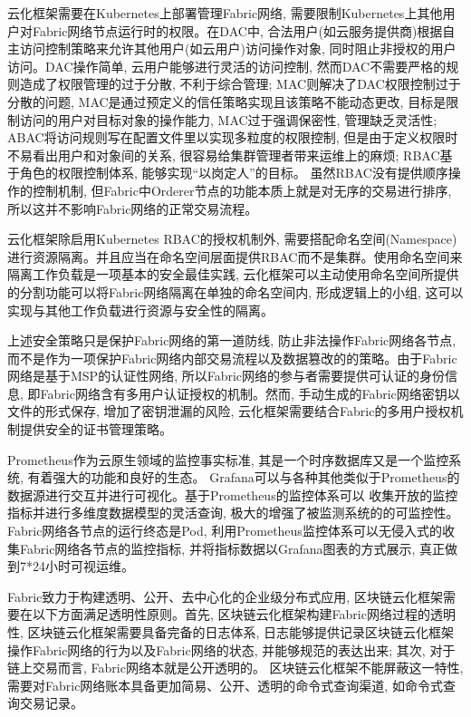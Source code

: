 云化框架需要在Kubernetes上部署管理Fabric网络, 需要限制Kubernetes上其他用户对Fabric网络节点运行时的权限。在DAC中, 合法用户(如云服务提供商)根据自主访问控制策略来允许其他用户(如云用户)访问操作对象\cite{lopez2018access}, 同时阻止非授权的用户访问。DAC操作简单, 云用户能够进行灵活的访问控制, 然而DAC不需要严格的规则造成了权限管理的过于分散, 不利于综合管理; MAC则解决了DAC权限控制过于分散的问题, MAC是通过预定义的信任策略实现且该策略不能动态更改, 目标是限制访问的用户对目标对象的操作能力, MAC过于强调保密性, 管理缺乏灵活性; ABAC将访问规则写在配置文件里以实现多粒度的权限控制, 但是由于定义权限时不易看出用户和对象间的关系, 很容易给集群管理者带来运维上的麻烦; RBAC基于角色的权限控制体系, 能够实现“以岗定人”的目标。 虽然RBAC没有提供顺序操作的控制机制, 但Fabric中Orderer节点的功能本质上就是对无序的交易进行排序,所以这并不影响Fabric网络的正常交易流程。

云化框架除启用Kubernetes RBAC的授权机制外, 需要搭配命名空间(Namespace)进行资源隔离。并且应当在命名空间层面提供RBAC而不是集群。使用命名空间来隔离工作负载是一项基本的安全最佳实践, 云化框架可以主动使用命名空间所提供的分割功能可以将Fabric网络隔离在单独的命名空间内, 形成逻辑上的小组, 这可以实现与其他工作负载进行资源与安全性的隔离。

上述安全策略只是保护Fabric网络的第一道防线, 防止非法操作Fabric网络各节点, 而不是作为一项保护Fabric网络内部交易流程以及数据篡改的的策略。由于Fabric网络是基于MSP的认证性网络, 所以Fabric网络的参与者需要提供可认证的身份信息, 即Fabric网络含有多用户认证授权的机制。然而, 手动生成的Fabric网络密钥以文件的形式保存, 增加了密钥泄漏的风险, 云化框架需要结合Fabric的多用户授权机制提供安全的证书管理策略。

Prometheus\cite{sukhija2019towards}作为云原生领域的监控事实标准, 其是一个时序数据库又是一个监控系统, 有着强大的功能和良好的生态。
Grafana可以与各种其他类似于Prometheus的数据源进行交互并进行可视化。基于Prometheus的监控体系可以
收集开放的监控指标并进行多维度数据模型的灵活查询, 极大的增强了被监测系统的的可监控性。Fabric网络各节点的运行终态是Pod, 利用Prometheus监控体系可以无侵入式的收集Fabric网络各节点的监控指标, 并将指标数据以Grafana图表的方式展示, 真正做到7*24小时可视运维。

Fabric致力于构建透明、公开、去中心化的企业级分布式应用, 区块链云化框架需要在以下方面满足透明性原则。首先, 区块链云化框架构建Fabric网络过程的透明性, 区块链云化框架需要具备完备的日志体系, 日志能够提供记录区块链云化框架操作Fabric网络的行为以及Fabric网络的状态, 并能够规范的表达出来; 其次, 对于链上交易而言, Fabric网络本就是公开透明的。 区块链云化框架不能屏蔽这一特性, 需要对Fabric网络账本具备更加简易、公开、透明的命令式查询渠道, 如命令式查询交易记录。


